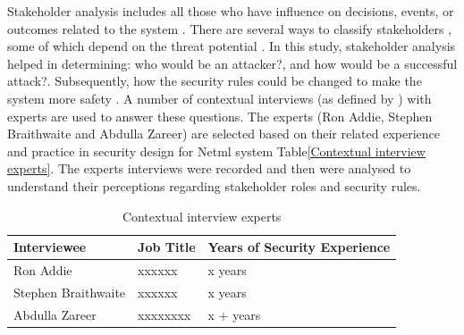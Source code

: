 \iffalse

Stakeholder analysis includes all those who have
influence on decisions, events, or outcomes related to
the system \cite{project2018guide,rose2013guide}. There
are several ways to classify stakeholders
\cite{reed2009s,maguire2012role,savage1991strategies,maynard2011stakeholders,bourne2016stakeholder,grimble1997stakeholder,billgren2008approaching}, 
some of which depend on the threat potential
\cite{almorsy2016analysis}\cite{savage1991strategies}\cite{scholl2005interoperability}.
In this study, stakeholder analysis helped in determining: who would be
an attacker?,  and how would be a successful attack?. Subsequently,
how the security rules could be changed to make the system  more
safety \cite{diver2007information}. A number of contextual interviews
(as defined by \cite{holtzblatt2004rapid}) with experts are used  to
answer these questions. The  experts (Ron Addie, Stephen Braithwaite
and Abdulla Zareer) are selected  based on their related experience
and practice in  security design for Netml system Table\ref{Contextual
interview experts}. The experts interviews were recorded and then were
analysed to understand  their perceptions regarding stakeholder roles
and security rules.  

\begin{table}[!htbp]         %
	\begin{center}
	\begin{tabular}{|l|p{2cm}|p{2cm}|}
		\hline
		\bf Interviewee & \multicolumn{1}{c}{\bf Job Title}
		& \multicolumn{1}{|c|}{\bf Years of Security Experience } \\
		\hline
Ron Addie & xxxxxx & x years  \\
\hline
		
Stephen Braithwaite & xxxxxx & x years  \\
\hline

Abdulla Zareer & xxxxxxxx & x + years 
\\ \hline
	\end{tabular}
	\end{center}
	\caption{Contextual interview experts }
\label{Contextual interview experts}
\end{table}



